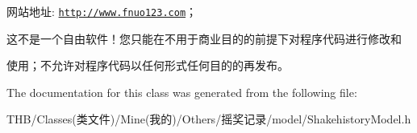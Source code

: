 网站地址\+: \href{http://www.fnuo123.com}{\tt http\+://www.\+fnuo123.\+com}； 



这不是一个自由软件！您只能在不用于商业目的的前提下对程序代码进行修改和

使用；不允许对程序代码以任何形式任何目的的再发布。 

 

The documentation for this class was generated from the following file\+:\begin{DoxyCompactItemize}
\item 
T\+H\+B/\+Classes(类文件)/\+Mine(我的)/\+Others/摇奖记录/model/Shakehistory\+Model.\+h\end{DoxyCompactItemize}
